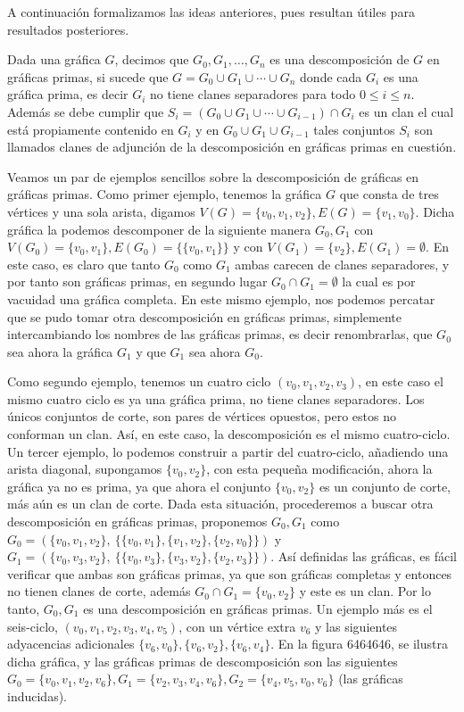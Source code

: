 A continuaci\'on formalizamos las ideas anteriores, pues resultan \'utiles para resultados posteriores. 

Dada una gr\'afica $G$, decimos que $G_0,G_1,\dots,G_n$ es una descomposici\'on de $G$ en gr\'aficas primas, si sucede que $G=G_0 \cup G_1\cup \cdots \cup G_n$ donde cada $G_i$ es una gr\'afica prima, es decir $G_i$ no tiene clanes separadores para todo $0\leq i \leq n$. Adem\'as se debe cumplir que $S_i=(G_0\cup G_1\cup \cdots \cup G_{i-1})\cap G_i$ es un clan el cual est\'a propiamente contenido en $G_i$ y en $G_0\cup G_1\cup G_{i-1}$ tales conjuntos $S_i$ son llamados clanes de adjunci\'on de la descomposici\'on en gr\'aficas primas en cuesti\'on. 

Veamos un par de ejemplos sencillos sobre la descomposición de gráficas en gráficas primas. Como primer ejemplo, tenemos la gráfica $G$ que consta de tres vértices y una sola arista, digamos $V(G)=\{v_0,v_1,v_2\}, E(G)=\{v_1,v_0\}$. Dicha gráfica la podemos descomponer de la siguiente manera $G_0,G_1$ con  $V(G_0)=\{v_0,v_1\}, E(G_0)=\{ \{v_0,v_1\} \} $ y con $V(G_1)=\{v_2\}, E(G_1)=\emptyset $. En este caso, es claro que tanto $G_0$ como $G_1$ ambas carecen de clanes separadores, y por tanto son gráficas primas, en segundo lugar $G_0\cap G_1= \emptyset$ la cual es por vacuidad una gráfica completa. En este mismo ejemplo, nos podemos percatar que se pudo tomar otra descomposición en gráficas primas, simplemente intercambiando los nombres de las gráficas primas, es decir renombrarlas, que $G_0$ sea ahora la gráfica $G_1$ y que $G_1$ sea ahora $G_0$. 

Como segundo ejemplo, tenemos un cuatro ciclo $(v_0,v_1,v_2,v_3)$, en este caso el mismo cuatro ciclo es ya una gráfica prima, no tiene clanes separadores. Los únicos conjuntos de corte, son pares de vértices opuestos, pero estos no conforman un clan. Así, en este caso, la descomposición es el mismo cuatro-ciclo. Un tercer ejemplo, lo podemos construir a partir del cuatro-ciclo, añadiendo una arista diagonal, supongamos $\{v_0,v_2\}$, con esta pequeña modificación, ahora la gráfica ya no es prima, ya que ahora el conjunto $\{v_0,v_2\}$ es un conjunto de corte, más aún es un clan de corte. Dada esta situación, procederemos a buscar otra descomposición en gráficas primas, proponemos $G_0,G_1$ como $G_0=(\{v_0,v_1,v_2 \},\ \{ \{v_0,v_1\},\{v_1,v_2\},\{v_2,v_0\} \} )$ y $G_1= ( \{v_0,v_3,v_2\}, \ \{ \{v_0,v_3\},\{v_3,v_2\},\{v_2,v_3\} \} )$. Así definidas las gráficas, es fácil verificar que ambas son gráficas primas, ya que son gráficas completas y entonces no tienen clanes de corte, además $G_0\cap G_1 = \{v_0,v_2 \}$ y este es un clan. Por lo tanto, $G_0, G_1$ es una descomposición en gráficas primas.
Un ejemplo más es el seis-ciclo, $(v_0,v_1,v_2,v_3,v_4,v_5)$, con un vértice extra $v_6$ y las siguientes adyacencias adicionales $\{v_6,v_0\},\{v_6,v_2\},\{v_6,v_4\}$. En la figura 6464646, se ilustra dicha gráfica, y las gráficas primas de descomposición son las siguientes $G_0=\{v_0,v_1,v_2,v_6\},G_1= \{v_2,v_3,v_4,v_6\},G_2=\{v_4,v_5,v_0,v_6\}$ (las gráficas inducidas).

